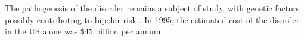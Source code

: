 The pathogenesis of the disorder remains a subject of study, with genetic factors possibly contributing to bipolar risk \cite{fears_multisystem_2014}. In 1995, the estimated cost of the disorder in the US alone was \$45 billion per annum \cite{wyatt_economic_1995}. 
  